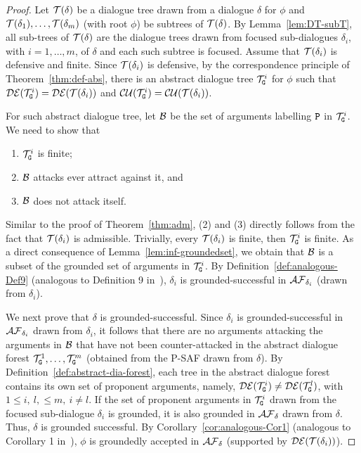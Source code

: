 \begin{proof}
Let $\mathcal{T}(\delta)$ be a dialogue tree drawn from a dialogue $\delta$ for $\phi$ and $\mathcal{T}(\delta_1), \ldots , \mathcal{T}(\delta_m)$ (with root $\phi$) be subtrees of $\mathcal{T}(\delta)$. By Lemma~\ref{lem:DT-subT}, all sub-trees of $\mathcal{T}(\delta)$ are the dialogue trees drawn from focused sub-dialogues $\delta_i$, with $i = 1, \ldots, m$, of $\delta$ and each such subtree is focused. Assume that $\mathcal{T}(\delta_i)$ is defensive and finite.
%
Since $\mathcal{T}(\delta_i)$ is defensive,
by the correspondence principle of Theorem~\ref{thm:def-abs}, there is an abstract dialogue tree $\mathcal{T}_{\texttt{\textup{G}}}^{i}$ for $\phi$ such that $\mathcal{DE}(\mathcal{T}_{\texttt{\textup{G}}}^{i})  =  \mathcal{DE}(\mathcal{T}(\delta_i))$ and $ \mathcal{CU}(\mathcal{T}_{\texttt{\textup{G}}}^{i})  =  \mathcal{CU}(\mathcal{T}(\delta_ i))$. 


For such abstract dialogue tree, let $\mathcal{B}$ be the set of arguments labelling $\texttt{\textup{P}}$ in  $\mathcal{T}_{\texttt{\textup{G}}}^{i}$. We need to show that 

\begin{enumerate}
    \item $\mathcal{T}_{\texttt{\textup{G}}}^{i}$ is finite;
    \item $\mathcal{B}$ attacks ever attract against it, and
    \item $\mathcal{B}$ does not attack itself.
\end{enumerate}

 Similar to the proof of Theorem~\ref{thm:adm}, (2) and (3) directly follows from the fact that $\mathcal{T}(\delta_i)$ is admissible.
 Trivially, every $\mathcal{T}(\delta_i)$ is finite, then $\mathcal{T}_{\texttt{\textup{G}}}^{i}$ is finite.
 As a direct consequence of Lemma~\ref{lem:inf-groundedset}, we obtain that $\mathcal{B}$ is a subset of the grounded set of arguments in $\mathcal{T}_{\texttt{\textup{G}}}^{i}$.
 By Definition~\ref{def:analogous-Def9} (analogous to Definition 9 in~\cite{loanho_2024}), $\delta_i$ is grounded-successful in $\mathcal{AF}_{\delta_i}$ (drawn from $\delta_i$).


We next prove that $\delta$ is grounded-successful. Since $\delta_i$ is grounded-successful in $\mathcal{AF}_{\delta_{i}}$ drawn from $\delta_i$, 
it follows that there are no arguments attacking the arguments in $\mathcal{B}$ that have not been counter-attacked in the abstract dialogue forest $\mathcal{T}_{\texttt{\textup{G}}}^{1}, \ldots, \mathcal{T}_{\texttt{\textup{G}}}^{m}$ (obtained from the P-SAF drawn from $\delta$).
%
%
By Definition~\ref{def:abstract-dia-forest}, each tree in the abstract dialogue forest contains its own set of proponent arguments, namely, $\mathcal{DE}(\mathcal{T}_{\texttt{\textup{G}}}^{i}) \neq \mathcal{DE}(\mathcal{T}_{\texttt{\textup{G}}}^{l})$, with $1 \leq i,\ l, \leq m,\ i \neq l$. If the set of proponent arguments in $\mathcal{T}_{\texttt{\textup{G}}}^{i}$ drawn from the focused sub-dialogue $\delta_i$ is grounded, it is also grounded in $\mathcal{AF}_{\delta}$ drawn from $\delta$. Thus, $\delta$ is grounded successful. By Corollary~\ref{cor:analogous-Cor1} (analogous to Corollary 1 in~\cite{loanho_2024}), $\phi$ is groundedly accepted in $\mathcal{AF}_{\delta}$ (supported by $\mathcal{DE}(\mathcal{T}(\delta_i))$).
\end{proof}
  
